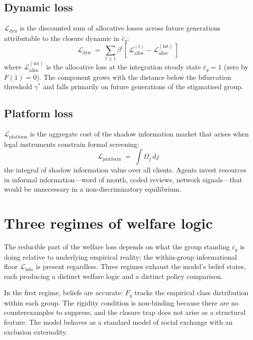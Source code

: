 \documentclass[12pt,a4paper]{article}
\theoremstyle{definition}
\numberwithin{proposition}{section}
\begin{document}
\subsection*{Dynamic loss}
$\mathcal{L}_{\text{dyn}}$ is the discounted sum of allocative losses
across future generations attributable to the closure dynamic in
$\bar{c}_g$:
\begin{equation}
  \mathcal{L}_{\text{dyn}}
  \;=\; \sum_{t \geq 1} \beta^t \!\left[\,
  \mathcal{L}_{\text{alloc}}^{(t)} - \mathcal{L}_{\text{alloc}}^{(\mathrm{int})}
  \,\right]
  \label{eq:L-dyn}
\end{equation}
where $\mathcal{L}_{\text{alloc}}^{(\mathrm{int})}$ is the allocative
loss at the integration steady state $\bar{c}_g = 1$ (zero by
$F(1) = 0$). The component grows with the distance below the
bifurcation threshold $\gamma^*$ and falls primarily on future
generations of the stigmatised group.

\subsection*{Platform loss}
$\mathcal{L}_{\text{platform}}$ is the aggregate cost of the shadow
information market that arises when legal instruments constrain
formal screening:
\begin{equation}
  \mathcal{L}_{\text{platform}} \;=\; \int \Omega_j \, dj
  \label{eq:L-platform}
\end{equation}
the integral of shadow information value over all clients. Agents
invest resources in informal information---word of mouth, coded
reviews, network signals---that would be unnecessary in a
non-discriminatory equilibrium.

\section{Three regimes of welfare logic}
\label{sec:welfare-cases}

The reducible part of the welfare loss depends on what the group
standing $\bar{c}_g$ is doing relative to underlying empirical reality;
the within-group informational floor $\mathcal{L}_{\text{info}}$ is
present regardless. Three regimes exhaust the model's belief states,
each producing a distinct welfare logic and a distinct policy
comparison.

In the first regime, beliefs are accurate: $F_g$ tracks the empirical
class distribution within each group. The rigidity condition is
non-binding because there are no counterexamples to suppress, and
the closure trap does not arise as a structural feature. The model
behaves as a standard model of social exchange with an exclusion
externality.
\end{document}
